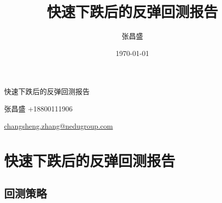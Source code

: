 \documentclass[12pt,a4paper]{article}
\title{快速下跌后的反弹回测报告}
\author{张昌盛}
\date{\today}
\begin{document}
 

\begin{titlepage}

\vspace{6pt}
\begin{center}
{\huge \fontsize{24bp}{\baselineskip} 快速下跌后的反弹回测报告 }
\end{center}

\hspace{270pt}
{\fontsize{16bp}{\baselineskip}张昌盛 +18800111906}


\hspace{270pt}
{\fontsize{16bp}{\baselineskip} \href{mailto:changsheng.zhang@nedugroup.com}{changsheng.zhang@nedugroup.com}}

\normalsize

\tableofcontents

\end{titlepage}

\newpage
\section{快速下跌后的反弹回测报告}

\subsection{回测策略}
\end{document}
